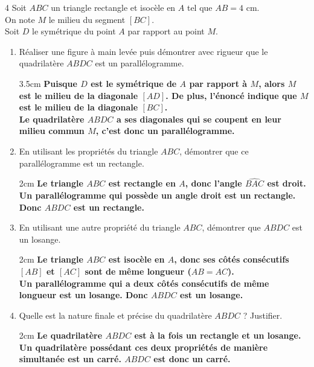 \documentclass[a4paper]{book}
\begin{document}
{    \begin{exerciceNote}{4}
        Soit $ABC$ un triangle rectangle et isocèle en $A$ tel que $AB = 4\text{ cm}$. \\
        On note $M$ le milieu du segment $[BC]$. \\
        Soit $D$ le symétrique du point $A$ par rapport au point $M$.
    
        \begin{enumerate}
            \item Réaliser une figure à main levée puis démontrer avec rigueur que le quadrilatère $ABDC$ est un parallélogramme.
            \begin{ZoneReponse}{3.5cm}
                \color{red}\bfseries
                Puisque $D$ est le symétrique de $A$ par rapport à $M$, alors $M$ est le milieu de la diagonale $[AD]$. De plus, l'énoncé indique que $M$ est le milieu de la diagonale $[BC]$.\\
                Le quadrilatère $ABDC$ a ses diagonales qui se coupent en leur milieu commun $M$, c'est donc un parallélogramme.
            \end{ZoneReponse}
            
            \item En utilisant les propriétés du triangle $ABC$, démontrer que ce parallélogramme est un rectangle.
            \begin{ZoneReponse}{2cm}
                \color{red}\bfseries
                Le triangle $ABC$ est rectangle en $A$, donc l'angle $\widehat{BAC}$ est droit.\\
                Un parallélogramme qui possède un angle droit est un rectangle. Donc $ABDC$ est un rectangle.
            \end{ZoneReponse}
            
            \item En utilisant une autre propriété du triangle $ABC$, démontrer que $ABDC$ est un losange.
            \begin{ZoneReponse}{2cm}
                \color{red}\bfseries
                Le triangle $ABC$ est isocèle en $A$, donc ses côtés consécutifs $[AB]$ et $[AC]$ sont de même longueur ($AB=AC$).\\
                Un parallélogramme qui a deux côtés consécutifs de même longueur est un losange. Donc $ABDC$ est un losange.
            \end{ZoneReponse}
            
            \item Quelle est la nature finale et précise du quadrilatère $ABDC$ ? Justifier.
            \begin{ZoneReponse}{2cm}
                \color{red}\bfseries
                Le quadrilatère $ABDC$ est à la fois un rectangle et un losange. Un quadrilatère possédant ces deux propriétés de manière simultanée est un carré. $ABDC$ est donc un carré.
            \end{ZoneReponse}
        \end{enumerate}
    \end{exerciceNote}


}
\end{document}
